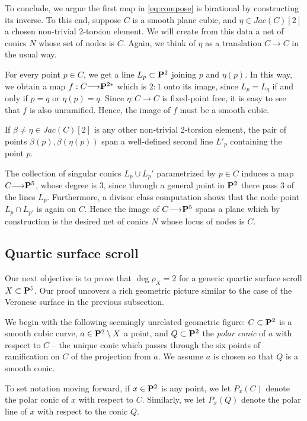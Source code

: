 \documentclass[11pt,reqno]{amsart}
\theoremstyle{plain}
\theoremstyle{definition}
\theoremstyle{remark}
\numberwithin{equation}{section}
\renewcommand{\to}{{\longrightarrow}}
\numberwithin{equation}{section}
\begin{document}
To conclude, we argue the first map in \eqref{eq:compose} is birational by constructing its inverse.  To this end, suppose $C$ is a smooth plane cubic, and $\eta \in Jac(C)[2]$ a chosen non-trivial $2$-torsion element. We will create from this data a net of conics $N$ whose set of nodes is $C$. Again, we think of $\eta$ as a translation $C \to C$ in the usual way.

  For every point $p \in C$, we get a line $L_{p} \subset \P^{2}$ joining $p$ and $\eta(p)$. In this way, we obtain a map $f: C \to \P^{2*}$ which is $2:1$ onto its image, since $L_{p} = L_{q}$ if and only if $p=q$ or $\eta(p)=q$.  Since  $\eta:C \to C$ is fixed-point free, it is easy to see that $f$ is also unramified. Hence, the image of $f$ must be a smooth cubic. 

  If $\beta \neq \eta \in Jac(C)[2]$ is any other non-trivial 2-torsion element, the pair of points $\beta(p), \beta(\eta(p))$ span a well-defined second line $L'_{p}$ containing the point $p$.  

  The collection of singular conics $L_{p} \cup L_{p}'$ parametrized by $p \in C$ induces a map $C \to \P^{5}$, whose degree is $3$, since  through a general point in $\P^{2}$ there pass $3$ of the lines $L_{p}$.  Furthermore, a divisor class computation shows that the node point $L_{p} \cap L_{p'}$ is again on $C$. Hence the image of $C \to \P^{5}$ spans a plane which by construction is the desired net of conics $N$ whose locus of nodes is $C$.


\subsection{Quartic surface scroll} Our next objective is to prove that $ \deg \rho_{X} = 2$ for a generic quartic surface scroll $X \subset \P^{5}$.  Our proof uncovers a  rich geometric picture similar to the case of the Veronese surface in the previous subsection.  


We begin with the following seemingly unrelated geometric figure: $C \subset \P^{2}$ is a smooth cubic curve, $a \in \P^{2} \setminus X$ a point, and $Q \subset \P^{2}$ the {\sl polar conic} of $a$ with respect to $C$ -- the unique conic which passes through the six points of ramification on $C$ of the projection from $a$.   We assume $a$ is chosen so that $Q$ is a smooth conic. 

To set notation moving forward, if $x \in \P^{2}$ is any point, we let $P_{x}(C)$ denote the polar conic of $x$ with respect to $C$.  Similarly, we let $P_{x}(Q)$ denote the polar line of $x$ with respect to the conic $Q$.
\end{document}
